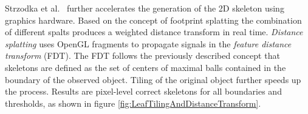 Strzodka et al.~\cite{strzodka2004generalized} further accelerates the generation of the 2D skeleton using graphics hardware. Based on the concept of footprint splatting the combination of different spalts produces a weighted distance transform in real time. \emph{Distance splatting} uses OpenGL fragments to propagate signals in the \emph{feature distance transform} (FDT). The FDT follows the previously described concept that skeletons are defined as the set of centers of maximal balls contained in the boundary of the observed object. Tiling of the original object further speeds up the process. Results are pixel-level correct skeletons for all boundaries and thresholds, as shown in figure \ref{fig:LeafTilingAndDistanceTransform}.


